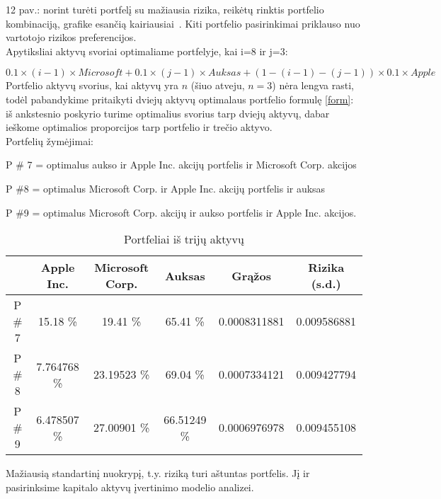 \documentclass[12pt, a14paper, lithuanian]{article}
\begin{document}
12 pav.: norint turėti portfelį su mažiausia rizika, reikėtų rinktis portfelio kombinaciją, grafike esančią kairiausiai~\cite{cope}. Kiti portfelio pasirinkimai priklauso nuo vartotojo rizikos preferencijos. \\

Apytiksliai aktyvų svoriai optimaliame portfelyje, kai i=8 ir j=3:

$ 0.1 \times (i-1) \times Microsoft + 0.1 \times (j-1) \times Auksas + (1 - (i-1) - (j-1)) \times  0.1 \times Apple$ \\



Portfelio aktyvų svorius, kai aktyvų yra $n$ (šiuo atveju, $n=3$) nėra lengva rasti, todėl pabandykime pritaikyti dviejų aktyvų optimalaus portfelio formulę \eqref{form}: iš ankstesnio poskyrio turime optimalius svorius tarp dviejų aktyvų, dabar ieškome optimalios proporcijos tarp portfelio ir trečio aktyvo. \\


Portfelių žymėjimai:

P \# 7 = optimalus aukso ir Apple Inc. akcijų portfelis ir Microsoft Corp. akcijos

P \#8 = optimalus Microsoft Corp. ir Apple Inc. akcijų portfelis ir auksas

P \#9 = optimalus Microsoft Corp. akcijų ir aukso portfelis ir Apple Inc. akcijos.

\begin{table}[ht]
\begin{center}
\begin{tabular}{cccccc}
  \hline
  & Apple Inc. & Microsoft Corp. & Auksas & Grąžos & Rizika (s.d.) \\ 
  \hline
P \# 7 & 15.18 \% & 19.41 \% & 65.41 \% & 0.0008311881 & 0.009586881 &\\
\hline
 P \# 8 & 7.764768 \% & 23.19523 \% & 69.04 \% & 0.0007334121 & 0.009427794 &\\ 
\hline
P \# 9 & 6.478507 \% & 27.00901 \% & 66.51249 \% & 0.0006976978 & 0.009455108 &\\
\hline

\end{tabular}
\end{center}
\caption{Portfeliai iš trijų aktyvų}
\end{table}


 Mažiausią standartinį nuokrypį, t.y. riziką turi aštuntas portfelis. Jį ir pasirinksime kapitalo aktyvų įvertinimo modelio analizei.
\\
\end{document}
